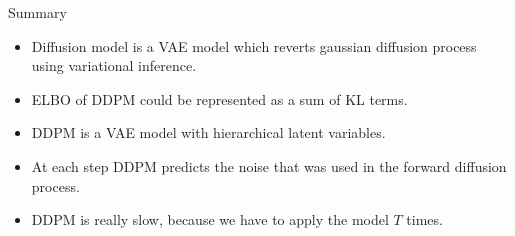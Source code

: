 \begin{frame}{Summary}
	\begin{itemize}
		\item Diffusion model is a VAE model which reverts gaussian diffusion process using variational inference.
		\vfill
		\item ELBO of DDPM could be represented as a sum of KL terms.
		\vfill
		\item DDPM is a VAE model with hierarchical latent variables.
		\vfill
		\item At each step DDPM predicts the noise that was used in the forward diffusion process.
		\vfill
		\item DDPM is really slow, because we have to apply the model $T$ times.
	\end{itemize}
\end{frame}
 